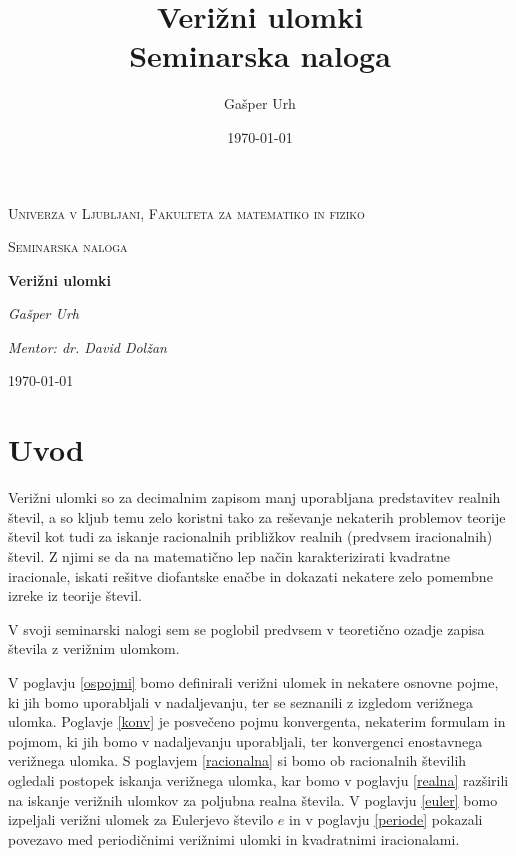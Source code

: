 \documentclass[a4paper,12pt]{article}
\title{\textbf{\huge{Verižni ulomki}\\\normalsize{Seminarska naloga}}}
\author{Gašper Urh}
\date{\today}
\theoremstyle{definition}
\theoremstyle{proposition}
\theoremstyle{theorem}
\theoremstyle{lemma}
\begin{document}
\begin{titlepage}
	\centering
	{\scshape\LARGE Univerza v Ljubljani, Fakulteta za matematiko in fiziko\par}
	\vspace{1cm}
	{\scshape\Large Seminarska naloga\par}
	\vspace{1.5cm}
	{\huge\bfseries Verižni ulomki\par}
	\vspace{2cm}
	{\Large\itshape Gašper Urh\par}

	\vfill

	{\textit{Mentor: dr. David Dolžan}}\par
	\vspace{1cm}
	{\large \today\par}
\end{titlepage}

\tableofcontents
\newpage

\section{Uvod}

Verižni ulomki so za decimalnim zapisom manj uporabljana predstavitev realnih števil, a so kljub temu zelo koristni tako za reševanje nekaterih problemov teorije števil kot tudi za iskanje racionalnih približkov realnih (predvsem iracionalnih) števil. Z njimi se da na matematično lep način karakterizirati kvadratne iracionale, iskati rešitve diofantske enačbe in dokazati nekatere zelo pomembne izreke iz teorije števil. \par
V svoji seminarski nalogi sem se poglobil predvsem v teoretično ozadje zapisa števila z verižnim ulomkom.\par
V poglavju \ref{ospojmi} bomo definirali verižni ulomek in nekatere osnovne pojme, ki jih bomo uporabljali v nadaljevanju, ter se seznanili z izgledom verižnega ulomka. Poglavje \ref{konv} je posvečeno pojmu konvergenta, nekaterim formulam in pojmom, ki jih bomo v nadaljevanju uporabljali, ter konvergenci enostavnega verižnega ulomka. S poglavjem \ref{racionalna} si bomo ob racionalnih številih ogledali postopek iskanja verižnega ulomka, kar bomo v poglavju \ref{realna} razširili na iskanje verižnih ulomkov za poljubna realna števila. V poglavju \ref{euler} bomo izpeljali verižni ulomek za Eulerjevo število $e$ in v poglavju \ref{periode} pokazali povezavo med periodičnimi verižnimi ulomki in kvadratnimi iracionalami.
\end{document}
